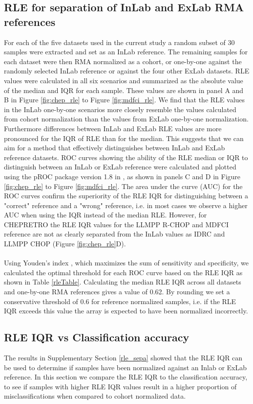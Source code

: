 \documentclass{article}
\begin{document}
\subsection*{RLE for separation of InLab and ExLab RMA references} \label{rle_sepa}
For each of the five datasets used in the current study a random subset of 30 samples were extracted and set as an InLab reference. The remaining samples for each dataset were then RMA normalized as a cohort, or one-by-one against the randomly selected InLab reference or against the four other ExLab datasets. RLE values were calculated in all six scenarios and summarized as the absolute value of the median and IQR for each sample. These values are shown in panel A and B in Figure \ref{fig:chep_rle} to Figure \ref{fig:mdfci_rle}. We find that the RLE values in the InLab one-by-one scenarios more closely resemble the values calculated from cohort normalization than the values from ExLab one-by-one normalization. Furthermore differences between InLab and ExLab RLE values are more pronounced for the IQR of RLE than for the median. This suggests that we can aim for a method that effectively distinguishes between InLab and ExLab reference datasets. ROC curves showing the ability of the RLE median or IQR to distinguish between an InLab or ExLab reference were calculated and plotted using the pROC package version 1.8 \citep{Robin2011} in \R, as shown in panels C and D in Figure \ref{fig:chep_rle} to Figure \ref{fig:mdfci_rle}. The area under the curve (AUC) for the ROC curves confirm the superiority of the RLE IQR for distinguishing between a "correct" reference and a "wrong" reference, i.e. in most cases we observe a higher AUC when using the IQR instead of the median RLE. However, for CHEPRETRO the RLE IQR values for the LLMPP R-CHOP and MDFCI reference are not as clearly separated from the InLab values as IDRC and LLMPP CHOP (Figure \ref{fig:chep_rle}D).\\\\
Using Youden's index \citet{Youden1950}, which maximizes the sum of sensitivity and specificity, we calculated the optimal threshold for each ROC curve based on the RLE IQR as shown in Table \ref{rleTable}. Calculating the median RLE IQR across all datasets and one-by-one RMA references gives a value of 0.62. By rounding we set a conservative threshold of 0.6 for reference normalized samples, i.e. if the RLE IQR exceeds this value the array is expected to have been normalized incorrectly.

\subsection*{RLE IQR vs Classification accuracy}
The results in Supplementary Section \ref{rle_sepa} showed that the RLE IQR can be used to determine if samples have been normalized against an Inlab or ExLab reference. In this section we compare the RLE IQR to the classification accuracy, to see if samples with higher RLE IQR values result in a higher proportion of misclassifications when compared to cohort normalized data. 
\end{document}
